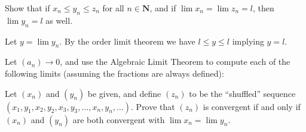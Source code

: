 \begin{exercise}
  Show that if $x_{n} \leq y_{n} \leq z_{n}$ for all $n \in \mathbf{N}$, and if $\lim x_{n}=\lim z_{n}=l$, then $\lim y_{n}=l$ as well.
\end{exercise}

\begin{solution}
  Let $y = \lim y_n$. By the order limit theorem we have $l \le y \le l$ implying $y = l$.
\end{solution}

\begin{exercise}
  Let $\left(a_{n}\right) \rightarrow 0$, and use the Algebraic Limit Theorem to compute each of the following limits (assuming the fractions are always defined):
\end{exercise}

\begin{solution}
\end{solution}


\begin{exercise}
  Let $\left(x_{n}\right)$ and $\left(y_{n}\right)$ be given, and define $\left(z_{n}\right)$ to be the ``shuffled'' sequence $\left(x_{1}, y_{1}, x_{2}, y_{2}, x_{3}, y_{3}, \ldots, x_{n}, y_{n}, \ldots\right)$. Prove that $\left(z_{n}\right)$ is convergent if and only if $\left(x_{n}\right)$ and $\left(y_{n}\right)$ are both convergent with $\lim x_{n}=\lim y_{n}$.
\end{exercise}


